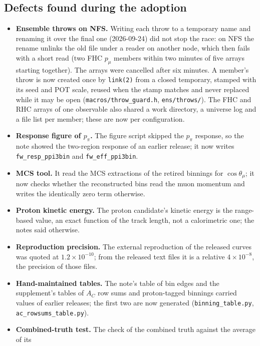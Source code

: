 \subsection{Defects found during the adoption}
\begin{itemize}\itemsep2pt
  \item \textbf{Ensemble throws on NFS.} Writing each throw to a temporary name and renaming it
    over the final one (2026-09-24) did not stop the race: on NFS the rename unlinks the old file
    under a reader on another node, which then fails with a short read (two FHC $p_\mu$ members
    within two minutes of five arrays starting together). The arrays were cancelled after six
    minutes. A member's throw is now created once by \texttt{link(2)} from a closed temporary,
    stamped with its seed and POT scale, reused when the stamp matches and never replaced while it
    may be open (\texttt{macros/throw\_guard.h}, \texttt{ens/throws/}). The FHC and RHC arrays of one
    observable also shared a work directory, a universe log and a file list per member; these are
    now per configuration.
  \item \textbf{Response figure of $p_\pi$.} The figure script skipped the $p_\pi$ response, so the
    note showed the two-region response of an earlier release; it now writes
    \texttt{fw\_resp\_ppi3bin} and \texttt{fw\_eff\_ppi3bin}.
  \item \textbf{MCS tool.} It read the MCS extractions of the retired binnings for
    $\cos\theta_\mu$; it now checks whether the reconstructed bins read the muon momentum and writes
    the identically zero term otherwise.
  \item \textbf{Proton kinetic energy.} The proton candidate's kinetic energy is the range-based
    value, an exact function of the track length, not a calorimetric one; the notes said otherwise.
  \item \textbf{Reproduction precision.} The external reproduction of the released curves was quoted
    at $1.2\times10^{-10}$; from the released text files it is a relative $4\times10^{-8}$, the
    precision of those files.
  \item \textbf{Hand-maintained tables.} The note's table of bin edges and the supplement's tables of
    $A_C$ row sums and proton-tagged binnings carried values of earlier releases; the first two are
    now generated (\texttt{binning\_table.py}, \texttt{ac\_rowsums\_table.py}).
  \item \textbf{Combined-truth test.} The check of the combined truth against the average of its

\end{itemize}
